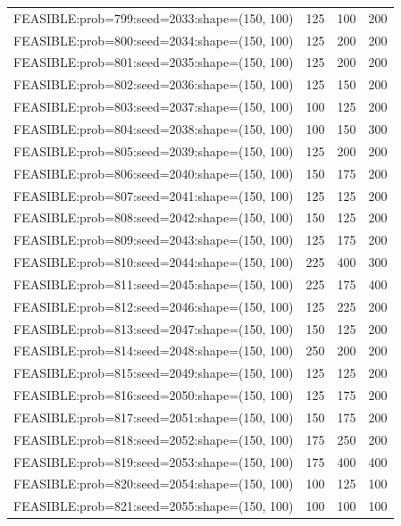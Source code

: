 \begin{longtable}{lccc}
FEASIBLE:prob=799:seed=2033:shape=(150, 100) &      125 &   100 &    200 \\
FEASIBLE:prob=800:seed=2034:shape=(150, 100) &      125 &   200 &    200 \\
FEASIBLE:prob=801:seed=2035:shape=(150, 100) &      125 &   200 &    200 \\
FEASIBLE:prob=802:seed=2036:shape=(150, 100) &      125 &   150 &    200 \\
FEASIBLE:prob=803:seed=2037:shape=(150, 100) &      100 &   125 &    200 \\
FEASIBLE:prob=804:seed=2038:shape=(150, 100) &      100 &   150 &    300 \\
FEASIBLE:prob=805:seed=2039:shape=(150, 100) &      125 &   200 &    200 \\
FEASIBLE:prob=806:seed=2040:shape=(150, 100) &      150 &   175 &    200 \\
FEASIBLE:prob=807:seed=2041:shape=(150, 100) &      125 &   125 &    200 \\
FEASIBLE:prob=808:seed=2042:shape=(150, 100) &      150 &   125 &    200 \\
FEASIBLE:prob=809:seed=2043:shape=(150, 100) &      125 &   175 &    200 \\
FEASIBLE:prob=810:seed=2044:shape=(150, 100) &      225 &   400 &    300 \\
FEASIBLE:prob=811:seed=2045:shape=(150, 100) &      225 &   175 &    400 \\
FEASIBLE:prob=812:seed=2046:shape=(150, 100) &      125 &   225 &    200 \\
FEASIBLE:prob=813:seed=2047:shape=(150, 100) &      150 &   125 &    200 \\
FEASIBLE:prob=814:seed=2048:shape=(150, 100) &      250 &   200 &    200 \\
FEASIBLE:prob=815:seed=2049:shape=(150, 100) &      125 &   125 &    200 \\
FEASIBLE:prob=816:seed=2050:shape=(150, 100) &      125 &   175 &    200 \\
FEASIBLE:prob=817:seed=2051:shape=(150, 100) &      150 &   175 &    200 \\
FEASIBLE:prob=818:seed=2052:shape=(150, 100) &      175 &   250 &    200 \\
FEASIBLE:prob=819:seed=2053:shape=(150, 100) &      175 &   400 &    400 \\
FEASIBLE:prob=820:seed=2054:shape=(150, 100) &      100 &   125 &    100 \\
FEASIBLE:prob=821:seed=2055:shape=(150, 100) &      100 &   100 &    100 \\

\end{longtable}
